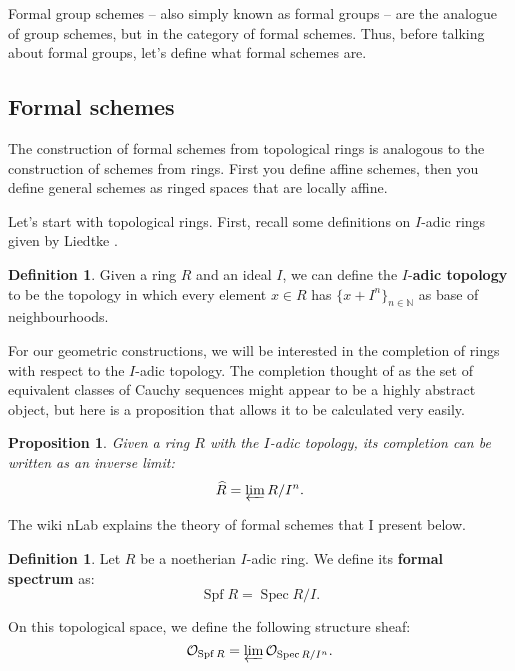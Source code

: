 \documentclass{report}
\DeclareMathOperator{\Spf}{Spf}
\DeclareMathOperator{\Spec}{Spec}
\newtheorem{proposition}[theorem]{Proposition}
\theoremstyle{definition}
\newtheorem{definition}[theorem]{Definition}
\begin{document}
Formal group schemes -- also simply known as formal groups -- are the analogue of group schemes, but in the category of formal schemes. Thus, before talking about formal groups, let's define what formal schemes are.

\subsection{Formal schemes}

The construction of formal schemes from topological rings is analogous to the construction of schemes from rings. First you define affine schemes, then you define general schemes as ringed spaces that are locally affine.

Let's start with topological rings. First, recall some definitions on $I$-adic rings given by Liedtke \cite[Section~12]{liedtke2022algebra}.

\begin{definition}
Given a ring $R$ and an ideal $I$, we can define the $I$-\textbf{adic topology} to be the topology in which every element $x\in R$ has $\{x+I^n\}_{n\in\mathbb{N}}$ as base of neighbourhoods.
\end{definition}

For our geometric constructions, we will be interested in the completion of rings with respect to the $I$-adic topology. The completion thought of as the set of equivalent classes of Cauchy sequences might appear to be a highly abstract object, but here is a proposition that allows it to be calculated very easily.

\begin{proposition}
Given a ring $R$ with the $I$-adic topology, its completion can be written as an inverse limit:
\[\widehat{R}=\varprojlim R/I^n.\]
\end{proposition}

The wiki nLab \cite{nlab2024formal} explains the theory of formal schemes that I present below.

\begin{definition}
Let $R$ be a noetherian $I$-adic ring. We define its \textbf{formal spectrum} as:
\[\Spf R=\Spec R/I.\]

On this topological space, we define the following structure sheaf:
\[\mathcal{O}_{\Spf R}=\varprojlim\mathcal{O}_{\Spec R/I^n}.\]
\end{definition}
\end{document}
